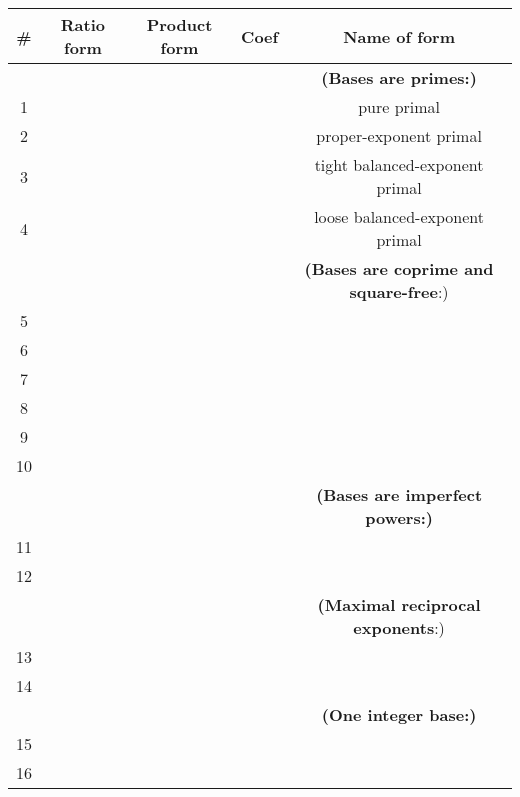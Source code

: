 \documentclass[12pt,english]{article}
\providecommand{\tabularnewline}{\\}
\theoremstyle{definition}
\theoremstyle{remark}
\theoremstyle{plain}
\theoremstyle{plain}
\begin{document}
\begin{table}[!h]
\begin{tabular}{|c|c|c|c|c|}
\hline 
{\small \negthinspace{}\negthinspace{}\#\negthinspace{}\negthinspace{}} & \textbf{Ratio form} & \textbf{Product form} & \negthinspace{}\negthinspace{}\textbf{\small Coef}\negthinspace{}\negthinspace{} & \textbf{Name of form}\tabularnewline
\hline 
\hline 
\multicolumn{4}{|c|}{} & \textbf{(Bases are primes:)}\tabularnewline
\hline 
{\small 1} & \rule[-11pt]{0pt}{33pt} &  &  & pure primal\tabularnewline
\hline 
{\small 2} & \rule[-11pt]{0pt}{33pt} &  &  & proper-exponent primal\tabularnewline
\hline 
{\small 3} & \rule[-11pt]{0pt}{34pt} &  &  & \negthinspace{}tight balanced-exponent primal\tabularnewline
\hline 
{\small 4} & \rule[-11pt]{0pt}{33pt} &  &  & loose balanced-exponent primal\tabularnewline
\hline 
\multicolumn{4}{|c|}{} & \textbf{(Bases are coprime and square-free}:)\tabularnewline
\hline 
{\small 5} & \rule[-11pt]{0pt}{33pt} &  &  & {\small }\tabularnewline
\hline 
{\small 6} & \rule[-11pt]{0pt}{33pt} &  &  & {\small }\tabularnewline
\hline 
7 & \rule[-11pt]{0pt}{33pt} &  &  & {\small }\tabularnewline
\hline 
{\small 8} & \rule[-11pt]{0pt}{33pt} &  &  & {\small }\tabularnewline
\hline 
{\small \negthinspace{}\negthinspace{}9\negthinspace{}\negthinspace{}} & \rule[-8pt]{0pt}{24pt} &  &  & {\small }\tabularnewline
\hline 
{\small \negthinspace{}\negthinspace{}10\negthinspace{}\negthinspace{}} & \rule[-11pt]{0pt}{33pt} &  &  & {\small }\tabularnewline
\hline 
\multicolumn{4}{|c|}{} & \textbf{(Bases are imperfect powers:)}\tabularnewline
\hline 
{\small \negthinspace{}\negthinspace{}11\negthinspace{}\negthinspace{}} & \rule[-8pt]{0pt}{24pt} &  &  & {\small }\tabularnewline
\hline 
{\small \negthinspace{}\negthinspace{}12\negthinspace{}\negthinspace{}} & \rule[-11pt]{0pt}{33pt} &  &  & {\small }\tabularnewline
\hline 
\multicolumn{4}{|c|}{} & \textbf{(Maximal reciprocal exponents}:)\tabularnewline
\hline 
{\small \negthinspace{}\negthinspace{}13\negthinspace{}\negthinspace{}} & \rule[-8pt]{0pt}{24pt} &  &  & {\small }\tabularnewline
\hline 
{\small \negthinspace{}\negthinspace{}14\negthinspace{}\negthinspace{}} & \rule[-11pt]{0pt}{33pt} &  &  & {\small }\tabularnewline
\hline 
\multicolumn{4}{|c|}{} & \textbf{(One integer base:)}\tabularnewline
\hline 
{\small \negthinspace{}\negthinspace{}15\negthinspace{}\negthinspace{}} & \rule[-11pt]{0pt}{33pt} &  &  & {\small }\tabularnewline
\hline 
\negthinspace{}\negthinspace{}16\negthinspace{}\negthinspace{} & \rule[-11pt]{0pt}{33pt} &  &  & {\small }\tabularnewline
\hline 
\end{tabular}
\end{table}
\end{document}
